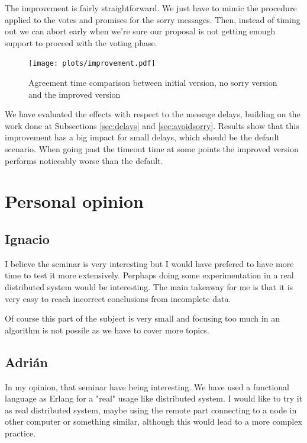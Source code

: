 \documentclass[a4paper, 10pt]{article}
\begin{document}
The improvement is fairly straightforward. We just have to mimic the procedure applied to the votes and promises for the sorry messages. Then, instead of timing out we can abort early when we're sure our proposal is not getting enough support to proceed with the voting phase.

\begin{figure}[H]
  \centering
  \texttt{[image: plots/improvement.pdf]}
    \caption{Agreement time comparison between initial version, no sorry version and the improved version}
\end{figure} 

We have evaluated the effects with respect to the message delays, building on the work done at Subsections \ref{sec:delays} and \ref{sec:avoidsorry}. Results show that this improvement has a big impact for small delays, which should be the default scenario. When going past the timeout time at some points the improved version performs noticeably worse than the default.

\clearpage
\section{Personal opinion}

\subsection{Ignacio}
I believe the seminar is very interesting but I would have prefered to have more time to test it more extensively. Perphaps doing some experimentation in a real distributed system would be interesting. The main takeaway for me is that it is very easy to reach incorrect conclusions from incomplete data.

Of course this part of the subject is very small and focusing too much in an algorithm is not possile as we have to cover more topics.

\subsection{Adrián}

In my opinion, that seminar have being interesting. We have used a functional language as Erlang for a "real" usage like distributed system. I would like to try it as real distributed system, maybe using the remote part connecting to a node in other computer or something similar, although this would lead to a more complex practice.
\end{document}
